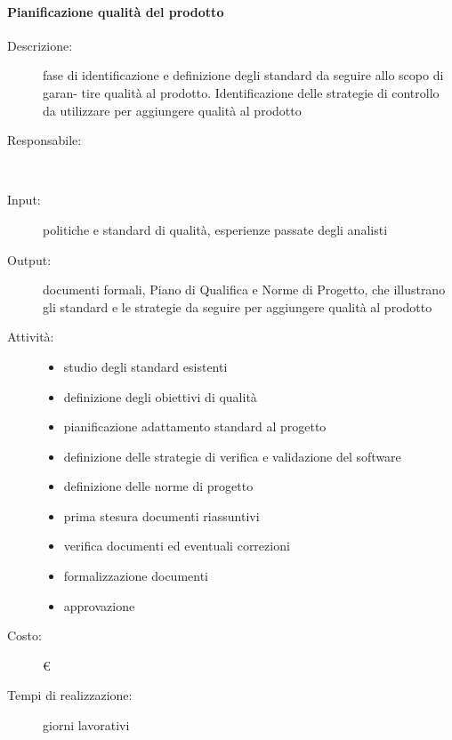 \paragraph{Pianificazione qualità del prodotto}
\begin{description}
\item[Descrizione:] fase di identificazione e definizione degli standard da seguire allo scopo di garan-
tire qualità al prodotto. Identificazione delle strategie di controllo da utilizzare per
aggiungere qualità al prodotto\\

\item[Responsabile:]  \\

\item[Input:] politiche e standard di qualità, esperienze passate degli analisti
\item[Output:] documenti formali, Piano di Qualifica e Norme di Progetto, che illustrano gli
standard e le strategie da seguire per aggiungere qualità al prodotto\\

\item[Attività:]
\begin{itemize}
\item studio degli standard esistenti
\item definizione degli obiettivi di qualità
\item pianificazione adattamento standard al progetto
\item definizione delle strategie di verifica e validazione del software
\item definizione delle norme di progetto
\item prima stesura documenti riassuntivi
\item verifica documenti ed eventuali correzioni
\item formalizzazione documenti
\item approvazione
\end{itemize}
\item[Costo:] \euro \\
\item[Tempi di realizzazione:]  giorni lavorativi
\end{description}



